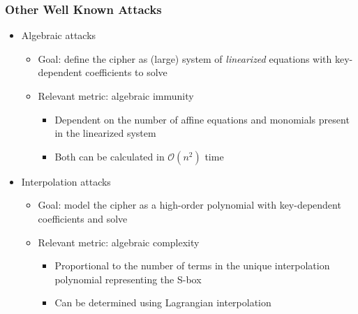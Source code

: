 \documentclass[handout,10pt]{beamer}
\begin{document}
\begin{frame}
	\frametitle{Other Well Known Attacks}
	\begin{itemize}
		\item Algebraic attacks
		\begin{itemize}
			\item Goal: define the cipher as (large) system of \emph{linearized} equations with key-dependent coefficients to solve 
			\item Relevant metric: algebraic immunity
			\begin{itemize}
				\item Dependent on the number of affine equations and monomials present in the linearized system
				\item Both can be calculated in $\mathcal{O}(n^2)$ time
			\end{itemize}
		\end{itemize}
		\pause
		\item Interpolation attacks
		\begin{itemize}
			\item Goal: model the cipher as a high-order polynomial with key-dependent coefficients and solve
			\item Relevant metric: algebraic complexity
			\begin{itemize}
				\item Proportional to the number of terms in the unique interpolation polynomial representing the S-box
				\item Can be determined using Lagrangian interpolation
			\end{itemize}
		\end{itemize}
	\end{itemize}
\end{frame}


\end{document}
